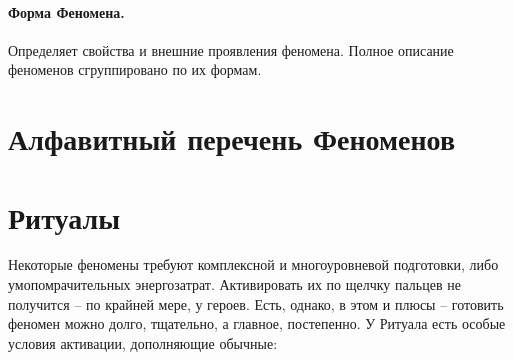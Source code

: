 \paragraph{Форма Феномена.} Определяет свойства и внешние проявления феномена. Полное описание феноменов сгруппировано по их формам.


\section{Алфавитный перечень Феноменов}
\printindex[powers]

\section{Ритуалы}
Некоторые феномены требуют комплексной и многоуровневой подготовки, либо умопомрачительных энергозатрат. Активировать их по щелчку пальцев не получится – по крайней мере, у героев. Есть, однако, в этом и плюсы – готовить феномен можно долго, тщательно, а главное, постепенно.
У Ритуала есть особые условия активации, дополняющие обычные:

